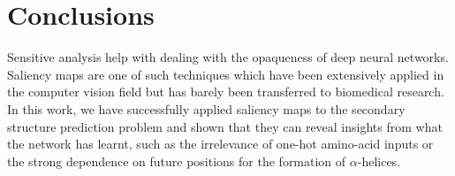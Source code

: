 \documentclass{article}
\begin{document}



\section{Conclusions}
\label{sec:conclusions}

Sensitive analysis help with dealing with the opaqueness of deep neural networks. Saliency maps are one of such techniques which have been extensively applied in the computer vision field but has barely been transferred to biomedical research. In this work, we have successfully applied saliency maps to the secondary structure prediction problem and shown that they can reveal insights from what the network has learnt, such as the irrelevance of one-hot amino-acid inputs or the strong dependence on future positions for the formation of $\alpha$-helices.

\end{document}
